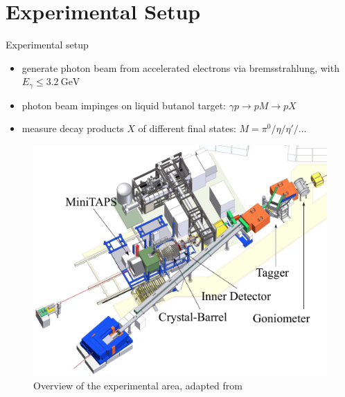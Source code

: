 \documentclass[11pt,aspectratio=169,dvipsnames]{beamer}
\begin{document}
\section{Experimental Setup}
\begin{frame}{Experimental setup}
	\begin{minipage}{.3\linewidth}
			\begin{itemize}
			\item generate photon beam from accelerated electrons via bremsstrahlung, with $E_\gamma\leq\SI{3.2}{\giga\eV}$ 
			\item photon beam impinges on liquid butanol target: $\gamma p \to p M\to p X$
			\item measure decay products $X$ of different final states: $M=\pi^0/\eta/\eta'/\dots$
		\end{itemize}
	\end{minipage}
	\begin{minipage}{.69\linewidth}
			\begin{figure}
			\centering
			\includegraphics[width=.9\linewidth]{CB-Area}
			\caption*{Overview of the experimental area, adapted from }
		\end{figure}
	\end{minipage}

\end{frame}
\end{document}
